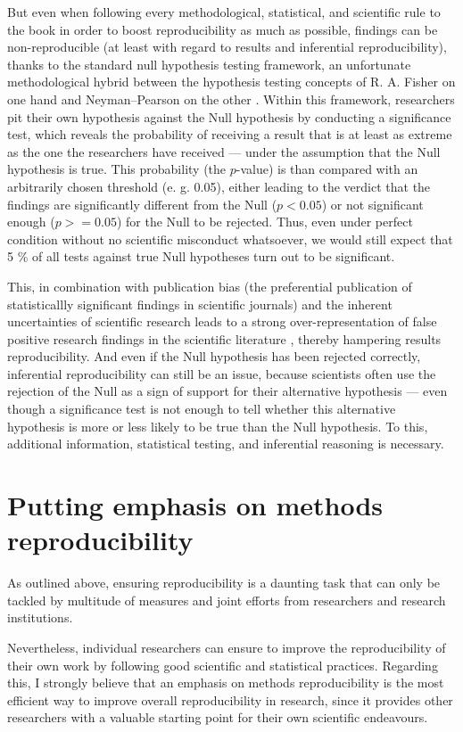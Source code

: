 \documentclass[11pt, a4paper,twoside]{report}\usepackage[]{graphicx}\usepackage[]{color}
\begin{document}
But even when following every methodological, statistical, and scientific rule to the book in order to boost reproducibility as much as possible, findings can be non-reproducible (at least with regard to results and inferential reproducibility), thanks to the standard null hypothesis testing framework, an unfortunate methodological hybrid between the hypothesis testing concepts of R. A. Fisher on one hand and Neyman--Pearson on the other \citep{amrhein_earth_2017}. Within this framework, researchers pit their own hypothesis against the Null hypothesis by conducting a significance test, which reveals the probability of receiving a result that is at least as extreme as the one the researchers have received --- under the assumption that the Null hypothesis is true. This probability (the $p$-value) is than compared with an arbitrarily chosen threshold (e. g. 0.05), either leading to the verdict that the findings are significantly different from the Null ($p < 0.05$) or not significant enough ($p >= 0.05$) for the Null to be rejected. Thus, even under perfect condition without no scientific misconduct whatsoever, we would still expect that 5 \% of all tests against true Null hypotheses turn out to be significant. 

This, in combination with publication bias (the preferential publication of statisticallly significant findings in scientific journals) and the inherent uncertainties of scientific research leads to a strong over-representation of false positive research findings in the scientific literature \citep{ioannidis_why_2005}, thereby hampering results reproducibility. And even if the Null hypothesis has been rejected correctly, inferential reproducibility can still be an issue, because scientists often use the rejection of the Null as a sign of support for their alternative hypothesis --- even though a significance test is not enough to tell whether this alternative hypothesis is more or less likely to be true than the Null hypothesis. To this, additional information, statistical testing, and inferential reasoning is necessary.

\section{Putting emphasis on methods reproducibility}
As outlined above, ensuring reproducibility is a daunting task that can only be tackled by multitude of measures and joint efforts from researchers and research institutions. 

Nevertheless, individual researchers can ensure to improve the reproducibility of their own work by following good scientific and statistical practices. Regarding this, I strongly believe that an emphasis on methods reproducibility is the most efficient way to improve overall reproducibility in research, since it provides other researchers with a valuable starting point for their own scientific endeavours.
\end{document}
